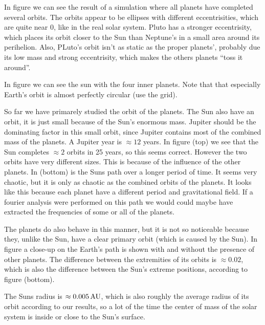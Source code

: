 
In figure  we can see the result of a simulation where all planets have completed several orbits. The orbits appear to be ellipses with different eccentrisities, which are quite near $0$, like in the real solar system. Pluto has a stronger eccentrisity, which places its orbit closer to the Sun than Neptune's in a small area around its perihelion. Also, PLuto's orbit isn't as static as the proper planets', probably due its low mass and strong eccentrisity, which makes the others planets ``toss it around''.


In figure  we can see the sun with the four inner planets. Note that that especially Earth's orbit is almost perfectly circular (use the grid).


So far we have primarely studied the orbit of the planets. The Sun also have an orbit, it is just small because of the Sun's enormous mass. Jupiter should be the dominating factor in this small orbit, since Jupiter contains most of the combined mass of the planets. A Jupiter year is $\approx 12$ years. In figure (top) we see that the Sun completes $\approx 2$ orbits in 25 years, so this seems correct. However the two orbits have very different sizes. This is because of the influence of the other planets. In (bottom) is the Suns path over a longer period of time. It seems very chaotic, but it is only as chaotic as the combined orbits of the planets. It looks like this because each planet have a different period and gravitational field. If a fourier analysis were performed on this path we would could maybe have extracted the frequencies of some or all of the planets.

The planets do also behave in this manner,  but it is not so noticeable because they, unlike the Sun, have a clear primary orbit (which is caused by the Sun). In figure  a close-up on the Earth's path is shown with and without the presence of other planets. The difference between the extremities of its orbits is $\approx 0.02$, which is also the difference between the Sun's extreme positions, according to figure (bottom).

The Suns radius is $\approx 0.005 \, \textrm{AU}$, which is also roughly the average radius of its orbit according to our results, so a lot of the time the center of mass of the solar system is inside or close to the Sun's surface.
